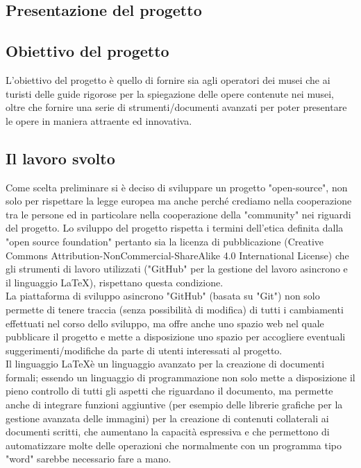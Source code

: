 \documentclass[hidelinks,12pt,a4paper]{article}
\begin{document}
\begin{flushleft}
		\section{Presentazione del progetto}
		\subsection{Obiettivo del progetto}
		L'obiettivo del progetto è quello di fornire sia agli operatori dei musei che ai turisti delle guide rigorose per la spiegazione delle opere contenute nei musei, oltre che fornire una serie di strumenti/documenti avanzati per poter presentare le opere in maniera attraente ed innovativa.
		
		\subsection{Il lavoro svolto}
		Come scelta preliminare si è deciso di sviluppare un progetto "open-source", non solo per rispettare la legge europea ma anche perché crediamo nella cooperazione tra le persone ed in particolare nella cooperazione della "community" nei riguardi del progetto. Lo sviluppo del progetto rispetta i termini dell'etica definita dalla "open source foundation" pertanto sia la licenza di pubblicazione (Creative Commons Attribution-NonCommercial-ShareAlike 4.0 International License) che gli strumenti di lavoro utilizzati ("GitHub" per la gestione del lavoro asincrono e il linguaggio \LaTeX), rispettano questa condizione.\\
		La piattaforma di sviluppo asincrono "GitHub" (basata su "Git") non solo permette di tenere traccia (senza possibilità di modifica) di tutti i cambiamenti effettuati nel corso dello sviluppo, ma offre anche uno spazio web nel quale pubblicare il progetto e mette a disposizione uno spazio per accogliere eventuali suggerimenti/modifiche da parte di utenti interessati al progetto.\\
		Il linguaggio \LaTeX è un linguaggio avanzato per la creazione di documenti formali; essendo un linguaggio di programmazione non solo mette a disposizione il pieno controllo di tutti gli aspetti che riguardano il documento, ma permette anche di integrare funzioni aggiuntive (per esempio delle librerie grafiche per la gestione avanzata delle immagini) per la creazione di contenuti collaterali ai documenti scritti, che aumentano la capacità espressiva e che permettono di automatizzare molte delle operazioni che normalmente con un programma tipo "word" sarebbe necessario fare a mano.\\

\end{flushleft}
\end{document}
